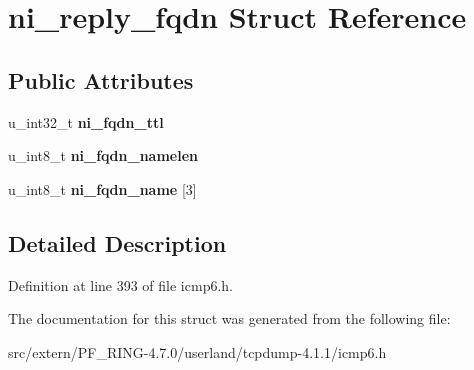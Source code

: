 \hypertarget{structni__reply__fqdn}{
\section{ni\_\-reply\_\-fqdn Struct Reference}
\label{structni__reply__fqdn}
}
\subsection*{Public Attributes}
\begin{DoxyCompactItemize}
\item 
\hypertarget{structni__reply__fqdn_a6e007f35b9414a62d7c399eb36ecc2a1}{
u\_\-int32\_\-t {\bfseries ni\_\-fqdn\_\-ttl}}
\label{structni__reply__fqdn_a6e007f35b9414a62d7c399eb36ecc2a1}

\item 
\hypertarget{structni__reply__fqdn_a1dc5d67de9249f6e7ada15a948fd1c62}{
u\_\-int8\_\-t {\bfseries ni\_\-fqdn\_\-namelen}}
\label{structni__reply__fqdn_a1dc5d67de9249f6e7ada15a948fd1c62}

\item 
\hypertarget{structni__reply__fqdn_af7147edd39fc60174d5a2670735321b5}{
u\_\-int8\_\-t {\bfseries ni\_\-fqdn\_\-name} \mbox{[}3\mbox{]}}
\label{structni__reply__fqdn_af7147edd39fc60174d5a2670735321b5}

\end{DoxyCompactItemize}


\subsection{Detailed Description}


Definition at line 393 of file icmp6.h.



The documentation for this struct was generated from the following file:\begin{DoxyCompactItemize}
\item 
src/extern/PF\_\-RING-\/4.7.0/userland/tcpdump-\/4.1.1/icmp6.h\end{DoxyCompactItemize}
